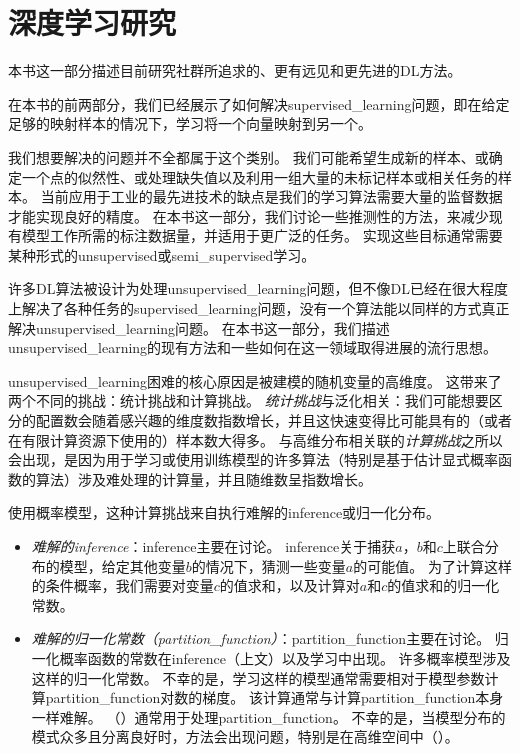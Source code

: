 \part{深度学习研究}
\label{part:deep_learning_research}

\newpage
本书这一部分描述目前研究社群所追求的、更有远见和更先进的\gls{DL}方法。

在本书的前两部分，我们已经展示了如何解决\gls{supervised_learning}问题，即在给定足够的映射样本的情况下，学习将一个向量映射到另一个。

我们想要解决的问题并不全都属于这个类别。
我们可能希望生成新的样本、或确定一个点的似然性、或处理缺失值以及利用一组大量的未标记样本或相关任务的样本。
当前应用于工业的最先进技术的缺点是我们的学习算法需要大量的监督数据才能实现良好的精度。
在本书这一部分，我们讨论一些推测性的方法，来减少现有模型工作所需的标注数据量，并适用于更广泛的任务。 
实现这些目标通常需要某种形式的\gls{unsupervised}或\gls{semi_supervised}学习。

许多\gls{DL}算法被设计为处理\gls{unsupervised_learning}问题，但不像\gls{DL}已经在很大程度上解决了各种任务的\gls{supervised_learning}问题，没有一个算法能以同样的方式真正解决\gls{unsupervised_learning}问题。
在本书这一部分，我们描述\gls{unsupervised_learning}的现有方法和一些如何在这一领域取得进展的流行思想。

\gls{unsupervised_learning}困难的核心原因是被建模的随机变量的高维度。
这带来了两个不同的挑战：统计挑战和计算挑战。
\emph{统计挑战}与泛化相关：我们可能想要区分的配置数会随着感兴趣的维度数指数增长，并且这快速变得比可能具有的（或者在有限计算资源下使用的）样本数大得多。
与高维分布相关联的\emph{计算挑战}之所以会出现，是因为用于学习或使用训练模型的许多算法（特别是基于估计显式概率函数的算法）涉及难处理的计算量，并且随维数呈指数增长。

使用概率模型，这种计算挑战来自执行难解的\gls{inference}或归一化分布。
\begin{itemize}
 \item \emph{难解的\gls{inference}}：\gls{inference}主要在讨论。
\gls{inference}关于捕获$a$，$b$和$c$上联合分布的模型，给定其他变量$b$的情况下，猜测一些变量$a$的可能值。
为了计算这样的条件概率，我们需要对变量$c$的值求和，以及计算对$a$和$c$的值求和的归一化常数。
 \item \emph{难解的归一化常数（\gls{partition_function}）}：\gls{partition_function}主要在讨论。
归一化概率函数的常数在\gls{inference}（上文）以及学习中出现。
许多概率模型涉及这样的归一化常数。
不幸的是，学习这样的模型通常需要相对于模型参数计算\gls{partition_function}对数的梯度。
该计算通常与计算\gls{partition_function}本身一样难解。
（）通常用于处理\gls{partition_function}。
不幸的是，当模型分布的模式众多且分离良好时，方法会出现问题，特别是在高维空间中（）。
\end{itemize}

